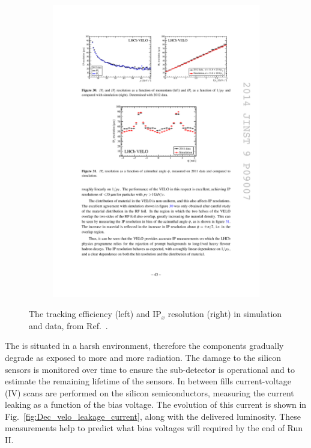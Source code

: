 \begin{figure}[!h]
\begin{subfigure}[t]{0.4\textwidth}
        \includegraphics[width=1.0\textwidth]{figs/Detector/velo_ipx_resolution.pdf}
    \end{subfigure}
    \caption{The tracking efficiency (left) and $\text{IP}_{x}$ resolution (right) in simulation and data, from Ref.~\cite{LHCb-DP-2014-001}.}
    \label{fig:Dec_velo_track_performance}   
\end{figure}

The \velo is situated in a harsh environment, therefore the components gradually degrade as exposed to more and more radiation. The damage to the silicon sensors is monitored over time to ensure the sub-detector is operational and to estimate the remaining lifetime of the sensors. In between \lhc fills current-voltage (IV) scans are performed on the silicon semiconductors, measuring the current leaking as a function of the bias voltage. The evolution of this current is shown in Fig.~\ref{fig:Dec_velo_leakage_current}, along with the delivered luminosity. These measurements help to predict what bias voltages will required by the end of Run II. 




